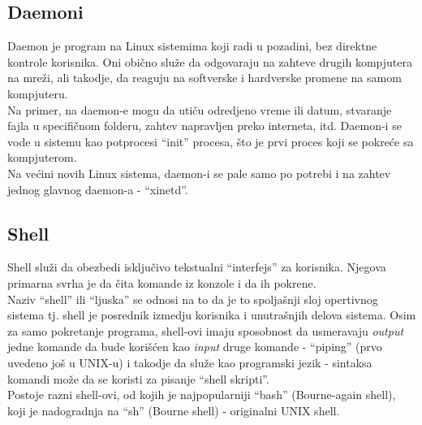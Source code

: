 \subsection{Daemoni}
Daemon je program na Linux sistemima koji radi u pozadini, bez direktne kontrole korisnika. Oni obično služe da odgovaraju na zahteve drugih kompjutera na mreži, ali takodje, da reaguju na softverske i hardverske promene na samom kompjuteru.\\
Na primer, na daemon-e mogu da utiču odredjeno vreme ili datum, stvaranje fajla u specifičnom folderu, zahtev napravljen preko interneta, itd.
Daemon-i se vode u sistemu kao potprocesi ``init'' procesa, što je prvi proces koji se pokreće sa kompjuterom.\\
Na većini novih Linux sistema, daemon-i se pale samo po potrebi i na zahtev jednog glavnog daemon-a - ``xinetd''.

\subsection{Shell}
Shell služi da obezbedi isključivo tekstualni ``interfejs'' za korisnika. Njegova primarna svrha je da čita komande iz konzole i da ih pokrene.\\
Naziv ``shell'' ili ``ljuska'' se odnosi na to da je to spoljašnji sloj opertivnog sistema tj. shell je posrednik izmedju korisnika i unutrašnjih delova sistema. Osim za samo pokretanje programa, shell-ovi imaju sposobnost da usmeravaju \textit{output} jedne komande da bude korišćen kao \textit{input} druge komande - ``piping'' (prvo uvedeno još u UNIX-u) i takodje da služe kao programski jezik - sintaksa komandi može da se koristi za pisanje ``shell skripti''.\\
Postoje razni shell-ovi, od kojih je najpopularniji ``bash'' (Bourne-again shell),  koji je nadogradnja na ``sh'' (Bourne shell) - originalni UNIX shell.
